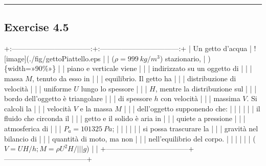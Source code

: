 \documentclass[letterpaper,10pt,italian]{jupyterBook}
\begin{document}
\bigskip\hrule\bigskip


\sphinxstepscope


\subsection{Exercise 4.5}
\label{\detokenize{polimi/fluidmechanics-ita/template/capitoli/04_bilanci/0409in:exercise-4-5}}\label{\detokenize{polimi/fluidmechanics-ita/template/capitoli/04_bilanci/0409in:fluid-mechanics-balances-ex-05}}\label{\detokenize{polimi/fluidmechanics-ita/template/capitoli/04_bilanci/0409in::doc}}
\sphinxAtStartPar
+:———————————:+:———————————:+
| Un getto d’acqua                  | !{[}image{]}(./fig/gettoPiattello.eps |
| (\(\rho=999\ kg/m^3\)) stazionario, | )\{width=»90\%»\}                    |
| piano e verticale viene           |                                   |
| indirizzato su un oggetto di      |                                   |
| massa \(M\), tenuto da esso in      |                                   |
| equilibrio. Il getto ha           |                                   |
| distribuzione di velocità         |                                   |
| uniforme \(U\) lungo lo spessore    |                                   |
| \(H\), mentre la distribuzione sul  |                                   |
| bordo dell’oggetto è triangolare  |                                   |
| di spessore \(h\) con velocità      |                                   |
| massima \(V\). Si calcoli la        |                                   |
| velocità \(V\) e la massa \(M\)       |                                   |
| dell’oggetto supponendo che:      |                                   |
|                                   |                                   |
| \sphinxhyphen{}   il fluido che circonda il     |                                   |
|     getto e il solido è aria in   |                                   |
|     quiete a pressione            |                                   |
|     atmosferica di                |                                   |
|     \(P_a = 101325\  Pa\);          |                                   |
|                                   |                                   |
| \sphinxhyphen{}   si possa trascurare la        |                                   |
|     gravità nel bilancio di       |                                   |
|     quantità di moto, ma non      |                                   |
|     nell’equilibrio del corpo.    |                                   |
|                                   |                                   |
| (\(V = U H / h ; M = \rho U^2 H /  |                                   |
| g\))                               |                                   |
+———————————–+———————————–+
\end{document}
